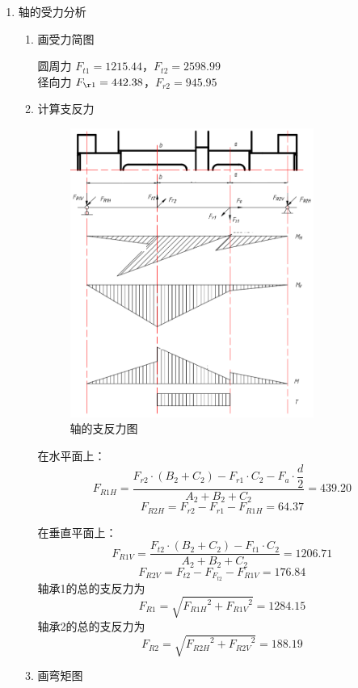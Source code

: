 \begin{enumerate}[A]
	\item 轴的受力分析
	\begin{enumerate}[a]
		\item 画受力简图
		\par 圆周力 $F_{t1}=1215.44$，$F_{t2}=2598.99$ \\
		径向力 $F_{\r1}=442.38$，$F_{r2}=945.95$
		\item 计算支反力 
		\begin{figure}[H]
			\begin{center}
				\includegraphics[width=0.8\textwidth]{pic/jiaohe2.png}
				\caption{轴\uppercase\expandafter{}的支反力图}
			\end{center}
		\end{figure}
		\par 在水平面上：
		$$F_{R1H}=\dfrac{F_{r2}\cdot \left(B_2+C_2\right)-F_{r1}\cdot C_2-F_a\cdot \dfrac{d}{2}}{A_2+B_2+C_2}=439.20$$
		$$F_{R2H}=F_{r2}-F_{r1}-F_{R1H}=64.37$$
		\par 在垂直平面上：
		$$F_{R1V}=\dfrac{F_{t2}\cdot \left(B_2+C_2\right)-F_{t1}\cdot C_2}{A_2+B_2+C_2}=1206.71$$
		$$F_{R2V}=F_{t2}-F_F_{t2}-F_{R1V}=176.84$$
		轴承1的总的支反力为
		$$F_{R1}=\sqrt{{F_{R1H}}^2+{F_{R1V}}^2}=1284.15$$
		轴承2的总的支反力为
		$$F_{R2}=\sqrt{{F_{R2H}}^2+{F_{R2V}}^2}=188.19$$
		\item 画弯矩图

\end{enumerate}
\end{enumerate}
